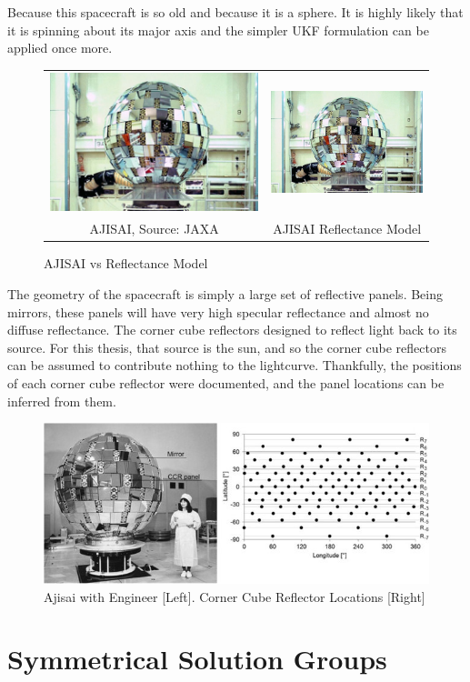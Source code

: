 Because this spacecraft is so old and because it is a sphere. It is highly likely that it is spinning about its major axis and the simpler UKF formulation can be applied once more.

\begin{figure}
	\begin{tabular}{cc}
	\includegraphics[width = 90mm]{figures/ajisai.jpg} & \includegraphics[width = 60mm]{figures/AJISAI} \\
	AJISAI, Source: JAXA & AJISAI Reflectance Model
	\end{tabular}
	\caption{AJISAI vs Reflectance Model}
\end{figure}

The geometry of the spacecraft is simply a large set of reflective panels. Being mirrors, these panels will have very high specular reflectance and almost no diffuse reflectance. The corner cube reflectors designed to reflect light back to its source. For this thesis, that source is the sun, and so the corner cube reflectors can be assumed to contribute nothing to the lightcurve. Thankfully, the positions of each corner cube reflector were documented, and the panel locations can be inferred from them.

\begin{figure}
	\centering
	\includegraphics[width = 150mm]{figures/ajisai_panels.jpg}
	\caption{Ajisai with Engineer [Left]. Corner Cube Reflector Locations [Right] \cite{ajisai}}
\end{figure}

\section{Symmetrical Solution Groups}